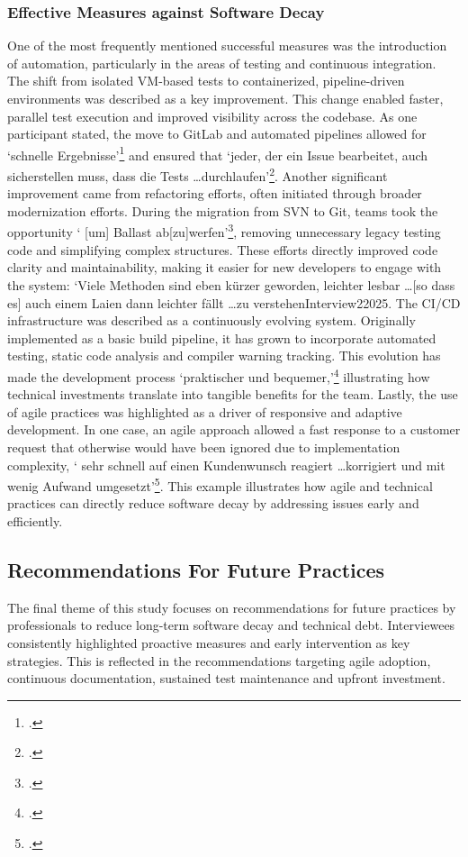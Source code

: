 \subsubsection{Effective Measures against Software Decay}
One of the most frequently mentioned successful measures was the introduction of automation, particularly in the areas of testing and continuous integration. The shift from isolated VM-based tests to containerized, pipeline-driven environments was described as a key improvement. This change enabled faster, parallel test execution
and improved visibility across the codebase. As one participant stated, the move to GitLab and automated pipelines allowed for `schnelle Ergebnisse'\footcite{Interview32025} and ensured that `jeder, der ein Issue bearbeitet, auch sicherstellen muss, dass die Tests \ldots durchlaufen'\footcite{Interview32025}.
Another significant improvement came from refactoring efforts, often initiated through broader modernization efforts. During the migration from SVN to Git, teams took the opportunity ` [um] Ballast ab[zu]werfen'\footcite{Interview32025}, removing unnecessary legacy testing code and simplifying complex structures. These efforts directly improved code clarity and maintainability,
making it easier for new developers to engage with the system: `Viele Methoden sind eben kürzer geworden, leichter lesbar \ldots [so dass es] auch einem Laien dann leichter fällt \ldots zu verstehen{Interview22025}.
The CI/CD infrastructure was described as a continuously evolving system. Originally implemented as a basic build pipeline, it has grown to incorporate automated testing, static code analysis and compiler warning tracking. This evolution has made the development process `praktischer und bequemer,'\footcite{Interview22025} illustrating how technical
investments translate into tangible benefits for the team.
Lastly, the use of agile practices was highlighted as a driver of responsive and adaptive development. In one case, an agile approach allowed a fast response to a customer request that otherwise would have been ignored due to implementation complexity, ` sehr schnell auf einen Kundenwunsch reagiert \ldots korrigiert und mit wenig Aufwand umgesetzt'\footcite{Interview32025}.
This example illustrates how agile and technical practices can directly reduce software decay by addressing issues early and efficiently.

\subsection{Recommendations For Future Practices}
The final theme of this study focuses on recommendations for future practices by professionals to reduce long-term software decay and technical debt. Interviewees consistently highlighted proactive measures and early intervention as key strategies. This is reflected in the recommendations targeting agile adoption, continuous documentation, sustained test maintenance and upfront investment.

